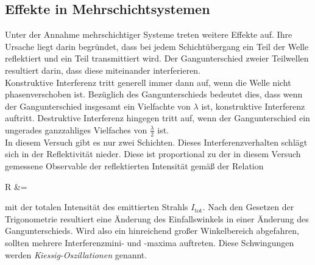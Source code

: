 \subsection{Effekte in Mehrschichtsystemen}
Unter der Annahme mehrschichtiger Systeme treten weitere Effekte auf. Ihre Ursache liegt darin begründet, dass bei jedem Schichtübergang ein Teil der Welle reflektiert und ein Teil transmittiert wird. Der Gangunterschied zweier Teilwellen resultiert darin, dass diese miteinander interferieren.\\
Konstruktive Interferenz tritt generell immer dann auf, wenn die Welle nicht phasenverschoben ist. Bezüglich des Gangunterschieds bedeutet dies, dass wenn der Gangunterschied insgesamt ein Vielfachte von $\lambda$ ist, konstruktive Interferenz auftritt. Destruktive Interferenz hingegen tritt auf, wenn der Gangunterschied ein ungerades ganzzahliges Vielfaches von $\frac{\lambda}{2}$ ist.\\
In diesem Versuch gibt es nur zwei Schichten. 
Dieses Interferenzverhalten schlägt sich in der Reflektivität nieder. Diese ist proportional zu der in diesem Versuch gemessene Observable der reflektierten Intensität gemäß der Relation 
\begin{aquation}
    R &= 
\end{aquation}
mit der totalen Intensität des emittierten Strahls $I_\text{tot}$. Nach den Gesetzen der Trigonometrie resultiert eine Änderung des Einfallswinkels in einer Änderung des Gangunterschieds. Wird also ein hinreichend großer Winkelbereich abgefahren, sollten mehrere Interferenzmini- und -maxima auftreten. Diese Schwingungen werden \textit{Kiessig-Oszillationen} genannt.


